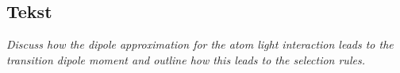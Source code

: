 \subsection{Tekst}

\emph{Discuss how the dipole approximation for the atom light interaction leads to the transition dipole moment and outline how this leads to the selection rules.}